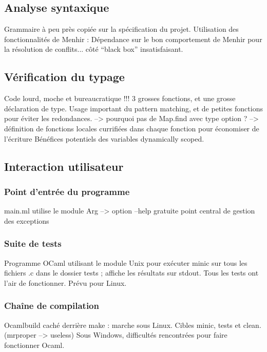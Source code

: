 \documentclass[a4paper, 11pt]{article}
\begin{document}
\subsection{Analyse syntaxique}

Grammaire à peu près copiée sur la spécification du projet.
Utilisation des fonctionnalités de Menhir :
Dépendance sur le bon comportement de Menhir pour la résolution de conflits...
côté ``black box'' insatisfaisant.

\subsection{Vérification du typage}

Code lourd, moche et bureaucratique !!!
3 grosses fonctions, et une grosse déclaration de type.
Usage important du pattern matching, et de petites fonctions pour éviter les redondances.
--> pourquoi pas de Map.find avec type option ?
--> définition de fonctions locales currifiées dans chaque fonction pour
  économiser de l'écriture
Bénéfices potentiels des variables dynamically scoped.

\subsection{Interaction utilisateur}

\subsubsection{Point d'entrée du programme}

main.ml
utilise le module Arg --> option --help gratuite
point central de gestion des exceptions

\subsubsection{Suite de tests}

Programme OCaml utilisant le module Unix pour exécuter minic sur tous les fichiers .c
dans le dossier tests ; affiche les résultats sur stdout.
Tous les tests ont l'air de fonctionner.
Prévu pour Linux.

\subsubsection{Chaîne de compilation}

Ocamlbuild caché derrière make : marche sous Linux.
Cibles minic, tests et clean. (mrproper --> useless)
Sous Windows, difficultés rencontrées pour faire fonctionner Ocaml.
\end{document}
